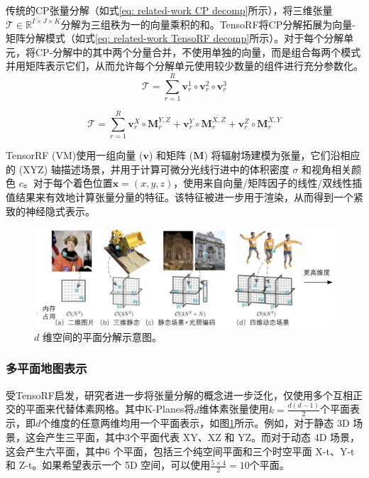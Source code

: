 传统的CP张量分解（如式\ref{eq: related-work CP decomp}所示），将三维张量$\mathcal{T}\in\mathbb{R}^{I\times J\times K}$分解为三组秩为一的向量乘积的和。TensoRF将CP分解拓展为向量-矩阵分解模式（如式\ref{eq: related-work TensoRF decomp}所示）。对于每个分解单元，将CP-分解中的其中两个分量合并，不使用单独的向量，而是组合每两个模式并用矩阵表示它们，从而允许每个分解单元使用较少数量的组件进行充分参数化。
\begin{equation}
    \mathcal{T} = \sum_{r=1}^R\mathbf{v}_r^1\circ\mathbf{v}_r^2\circ\mathbf{v}_r^3
    \label{eq: related-work CP decomp}
\end{equation}

\begin{equation}
    \mathcal{T} = \sum_{r=1}^R\mathbf{v}_r^X\circ\mathbf{M}_r^{Y,Z}+\mathbf{v}_r^Y\circ\mathbf{M}_r^{X,Z}+\mathbf{v}_r^Z\circ\mathbf{M}_r^{X,Y}
    \label{eq: related-work TensoRF decomp}
\end{equation}

TensorRF (VM)使用一组向量 ($\mathbf{v}$) 和矩阵 ($\mathbf{M}$) 将辐射场建模为张量，它们沿相应的 (XYZ) 轴描述场景，并用于计算可微分光线行进中的体积密度 $\sigma$ 和视角相关颜色 $c$。对于每个着色位置$ \mathbf{x} = (x, y, z)$，使用来自向量/矩阵因子的线性/双线性插值结果来有效地计算张量分量的特征。该特征被进一步用于渲染，从而得到一个紧致的神经隐式表示。

\begin{figure}[ht]
    \centering
    \includegraphics[width=\textwidth]{undergraduate-thesis/images/related-work/kplanes-teaser.pdf}
    \caption{$d$ 维空间的平面分解示意图\cite{fridovich-keil_k-planes_2023}。}
    \label{fig:related-work kplane-teaser}
\end{figure}

\subsubsection{多平面地图表示}
受TensoRF启发，研究者进一步将张量分解的概念进一步泛化，仅使用多个互相正交的平面来代替体素网格\cite{fridovich-keil_k-planes_2023, cao_hexplane_2023, reiser_merf_2023, chan_efficient_2022}。其中K-Planes\cite{fridovich-keil_k-planes_2023}将$d$维体素张量使用$k=\frac{d(d-1)}{2}$个平面表示，即$d$个维度的任意两维均用一个平面表示，如图\ref{fig:related-work kplane-teaser}所示。例如，对于静态 3D 场景，这会产生三平面，其中3个平面代表 XY、XZ 和 YZ。而对于动态 4D 场景，这会产生六平面，其中6 个平面，包括三个纯空间平面和三个时空平面 X-t、Y-t 和 Z-t。如果希望表示一个 5D 空间，可以使用$\frac{5\times4}{2}=10$个平面。


